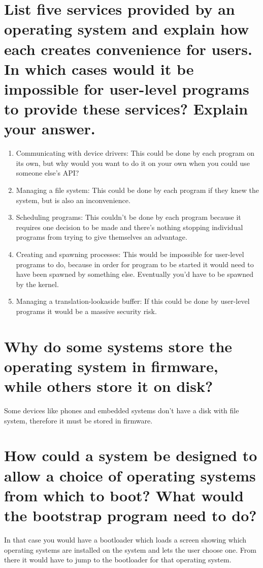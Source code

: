 \documentclass{book}%
\begin{document}
\section{List five services provided by an operating system and explain how each
creates convenience for users. In which cases would it be impossible for 
user-level programs to provide these services? Explain your answer.}
\begin{enumerate}
\item Communicating with device drivers: This could be done by each program on 
its own, but why would you want to do it on your own when you could use someone 
else's API?
\item Managing a file system: This could be done by each program if they knew 
the system, but is also an inconvenience.
\item Scheduling programs: This couldn't be done by each program because it 
requires one decision to be made and there's nothing stopping individual 
programs from trying to give themselves an advantage.
\item Creating and spawning processes: This would be impossible for user-level 
programs to do, because in order for  program to be started it would need to 
have been spawned by something else. Eventually you'd have to be spawned by the 
kernel.
\item Managing a translation-lookaside buffer: If this could be done by 
user-level programs it would be a massive security risk.
\end{enumerate}
\section{Why do some systems store the operating system in firmware, while 
others store it on disk?}
Some devices like phones and embedded systems don't have a disk with  file 
system, therefore it must be stored in firmware.
\section{How could a system be designed to allow a choice of operating systems 
from which to boot? What would the bootstrap program need to do?}
In that case you would have a bootloader which loads a screen showing which 
operating systems are installed on the system and lets the user choose one. From
there it would have to jump to the bootloader for that operating system.
\end{document}
